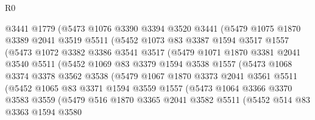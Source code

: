 \begin{lexlean}{R0}
\begin{coremodule}
              @3441
              @1779
              (@5473
                @1076
                @3390
                @3394
                @3520
                @3441
                (@5479
                  @1075
                  @1870
                  @3389
                  @2041
                  @3519
                  @5511
                  (@5452
                    @1073
                    @83
                    @3387
                    @1594
                    @3517
                    @1557
                    (@5473
                      @1072
                      @3382
                      @3386
                      @3541
                      @3517
                      (@5479
                        @1071
                        @1870
                        @3381
                        @2041
                        @3540
                        @5511
                        (@5452
                          @1069
                          @83
                          @3379
                          @1594
                          @3538
                          @1557
                          (@5473
                            @1068
                            @3374
                            @3378
                            @3562
                            @3538
                            (@5479
                              @1067
                              @1870
                              @3373
                              @2041
                              @3561
                              @5511
                              (@5452
                                @1065
                                @83
                                @3371
                                @1594
                                @3559
                                @1557
                                (@5473
                                  @1064
                                  @3366
                                  @3370
                                  @3583
                                  @3559
                                  (@5479
                                    @516
                                    @1870
                                    @3365
                                    @2041
                                    @3582
                                    @5511
                                    (@5452
                                      @514
                                      @83
                                      @3363
                                      @1594
                                      @3580

\end{coremodule}
\end{lexlean}
